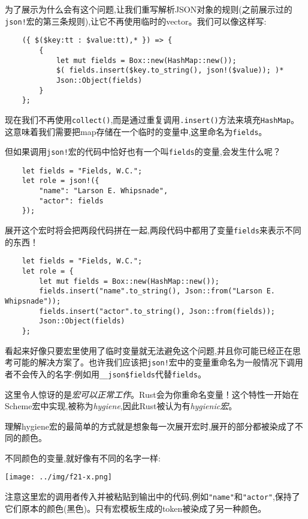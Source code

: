 为了展示为什么会有这个问题,让我们重写解析JSON对象的规则(之前展示过的\texttt{json!}宏的第三条规则),让它不再使用临时的vector。我们可以像这样写:
\begin{verbatim}
    ({ $($key:tt : $value:tt),* }) => {
        {
            let mut fields = Box::new(HashMap::new());
            $( fields.insert($key.to_string(), json!($value)); )*
            Json::Object(fields)
        }
    };
\end{verbatim}

现在我们不再使用\texttt{collect()},而是通过重复调用\texttt{.insert()}方法来填充\texttt{HashMap}。这意味着我们需要把map存储在一个临时的变量中,这里命名为\texttt{fields}。

但如果调用\texttt{json!}宏的代码中恰好也有一个叫\texttt{fields}的变量,会发生什么呢？
\begin{verbatim}
    let fields = "Fields, W.C.";
    let role = json!({
        "name": "Larson E. Whipsnade",
        "actor": fields
    });
\end{verbatim}

展开这个宏时将会把两段代码拼在一起,两段代码中都用了变量\texttt{fields}来表示不同的东西！
\begin{verbatim}
    let fields = "Fields, W.C.";
    let role = {
        let mut fields = Box::new(HashMap::new());
        fields.insert("name".to_string(), Json::from("Larson E. Whipsnade"));
        fields.insert("actor".to_string(), Json::from(fields));
        Json::Object(fields)
    };
\end{verbatim}

看起来好像只要宏里使用了临时变量就无法避免这个问题,并且你可能已经正在思考可能的解决方案了。也许我们应该把\texttt{json!}宏中的变量重命名为一般情况下调用者不会传入的名字:例如用\texttt{\_\_json\$fields}代替\texttt{fields}。

这里令人惊讶的是\emph{宏可以正常工作}。Rust会为你重命名变量！这个特性一开始在Scheme宏中实现,被称为\emph{hygiene},因此Rust被认为有\emph{hygienic宏}。

理解hygiene宏的最简单的方式就是想象每一次展开宏时,展开的部分都被染成了不同的颜色。

不同颜色的变量,就好像有不同的名字一样:
\begin{figure*}[h]
    \centering
    \texttt{[image: ../img/f21-x.png]}
\end{figure*}
注意这里宏的调用者传入并被粘贴到输出中的代码,例如\texttt{"name"}和\texttt{"actor"},保持了它们原本的颜色(黑色)。只有宏模板生成的token被染成了另一种颜色。

